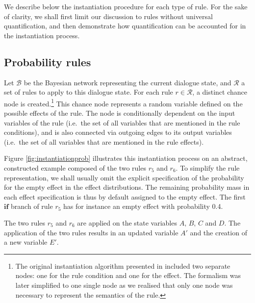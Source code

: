 We describe below the instantiation procedure for each type of rule. For the sake of clarity, we shall first limit our discussion to rules without universal quantification, and then demonstrate how quantification can be accounted for in the instantiation process. 

\subsection{Probability rules}
\label{sec:probruleinstantiation}

Let $\mathcal{B}$ be the Bayesian network representing the current dialogue state, and $\mathcal{R}$ a set of rules to apply to this dialogue state.  For each rule $r \in \mathcal{R}$, a distinct chance node is created.\footnote{The original instantiation algorithm presented in \citep{rulebasedmodels-sigdial2012} included two separate nodes: one for the rule condition and one for the effect.  The formalism was later simplified to one single node as we realised that only one node was necessary to represent the semantics of the rule.} This chance node represents a random variable defined on the possible effects of the rule.  The node is conditionally dependent on the input variables of the rule (i.e.\ the set of all variables that are mentioned in the rule conditions), and is also connected via outgoing edges to its output variables (i.e.\ the set of all variables that are mentioned in the rule effects). 

Figure \ref{fig:instantiationprob} illustrates this instantiation process on an abstract, constructed example composed of the two rules $r_5$ and $r_6$.  To simplify the rule representation, we shall usually omit the explicit specification of the probability for the empty effect in the effect distributions.  The remaining probability mass in each effect specification  is thus by default assigned to the empty effect.  The first $\mathbf{if}$ branch of rule $r_5$ has for instance an empty effect with probability 0.4.

The two rules $r_5$ and $r_6$ are applied on the state variables $A$, $B$, $C$ and $D$.  The application of the two rules results in an updated variable $A'$ and the creation of a new variable $E'$. 

